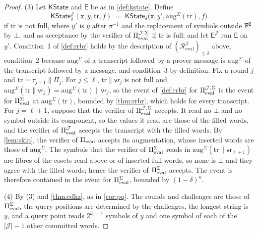 \begin{proof}
(3) Let $\mathsf{KState}$ and $\mathsf{E}$ be as in \cref{def:kstate}. Define
\[
  \mathsf{KState}^{\mathcal{J}}_\delta(\mathtt{x}, y, \mathrm{tr}, f) \;=\; \mathsf{KState}_\delta\bigl(\mathtt{x}, y', \mathrm{aug}^{\Sigma}(\mathrm{tr}), f\bigr)
\]
if $\mathrm{tr}$ is not full, where $y'$ is $y$ after $\pi^{-1}$ and the replacement of symbols outside $\mathbb{F}^2$ by $\bot$, and as acceptance by the verifier of $\Pi_{\mathrm{eval}}^{\mathcal{J},\Sigma}$ if $\mathrm{tr}$ is full; and let $\mathsf{E}^{\mathcal{J}}$ run $\mathsf{E}$ on $y'$.
Condition~1 of \cref{def:rrbr} holds by the description of $(\mathcal{R}^{\mathcal{J}}_{\mathrm{eval}})_{\le\delta}$ above, condition~2 because $\mathrm{aug}^{\Sigma}$ of a transcript followed by a prover message is $\mathrm{aug}^{\Sigma}$ of the transcript followed by a message, and condition~3 by definition.
Fix a round $j$ and $\mathrm{tr} = \tau_{j-1} \| \Pi_j$. For $j \le \ell$, $\mathrm{tr} \| \mathsf{vr}_j$ is not full and $\mathrm{aug}^{\Sigma}(\mathrm{tr}\|\mathsf{vr}_j) = \mathrm{aug}^{\Sigma}(\mathrm{tr})\|\mathsf{vr}_j$, so the event of \cref{def:rrbr} for $\Pi_{\mathrm{eval}}^{\mathcal{J},\Sigma}$ is the event for $\Pi_{\mathrm{eval}}^{\Sigma}$ at $\mathrm{aug}^{\Sigma}(\mathrm{tr})$, bounded by \cref{thm:rrbr}, which holds for every transcript.
For $j = \ell + 1$, suppose that the verifier of $\Pi_{\mathrm{eval}}^{\mathcal{J},\Sigma}$ accepts. It read no $\bot$ and no symbol outside its component, so the values it read are those of the filled words, and the verifier of $\Pi_{\mathrm{eval}}^{\mathcal{J}}$ accepts the transcript with the filled words. By \cref{lem:skip}, the verifier of $\Pi_{\mathrm{eval}}$ accepts its augmentation, whose inserted words are those of $\mathrm{aug}^{\Sigma}$. The symbols that the verifier of $\Pi_{\mathrm{eval}}^{\Sigma}$ reads in $\mathrm{aug}^{\Sigma}(\mathrm{tr} \| \mathsf{vr}_{\ell+1})$ are fibres of the cosets read above or of inserted full words, so none is $\bot$ and they agree with the filled words; hence the verifier of $\Pi_{\mathrm{eval}}^{\Sigma}$ accepts. The event is therefore contained in the event for $\Pi_{\mathrm{eval}}^{\Sigma}$, bounded by $(1-\delta)^{\kappa}$.

(4) By (3) and \cref{thm:cdhz}, as in \cref{cor:pq}. The rounds and challenges are those of $\Pi_{\mathrm{eval}}^{\Sigma}$, the query positions are determined by the challenges, the longest string is $y$, and a query point reads $2^{d_0-1}$ symbols of $y$ and one symbol of each of the $|\mathcal{J}| - 1$ other committed words.
\end{proof}

